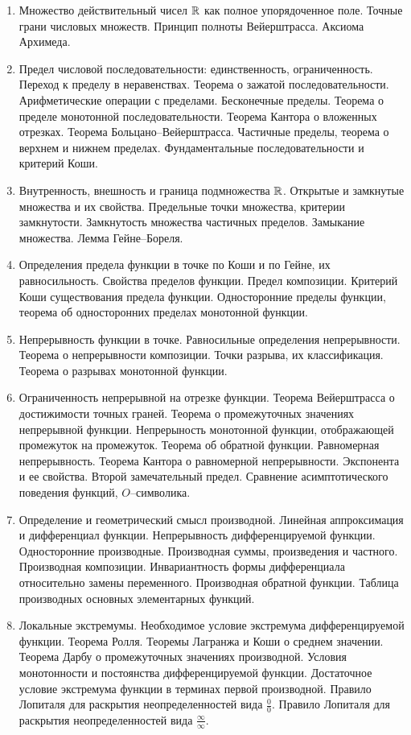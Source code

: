\begin{enumerate}
    \item Множество действительный чисел $\mathbb{R}$ как полное упорядоченное поле. Точные грани числовых множеств. Принцип полноты Вейерштрасса. Аксиома Архимеда.
    \item Предел числовой последовательности: единственность, ограниченность. Переход к пределу в неравенствах. Теорема о зажатой последовательности. Арифметические операции с пределами. Бесконечные пределы. Теорема о пределе монотонной последовательности. Теорема Кантора о вложенных отрезках. Теорема Больцано--Вейерштрасса. Частичные пределы, теорема о верхнем и нижнем пределах. Фундаментальные последовательности и критерий Коши.
    \item Внутренность, внешность и граница подмножества $\mathbb{R}$. Открытые и замкнутые множества и их свойства. Предельные точки множества, критерии замкнутости. Замкнутость множества частичных пределов. Замыкание множества. Лемма Гейне--Бореля.
    \item Определения предела функции в точке по Коши и по Гейне, их равносильность. Свойства пределов функции. Предел композиции. Критерий Коши существования предела функции. Односторонние пределы функции, теорема об односторонних пределах монотонной функции.
    \item Непрерывность функции в точке. Равносильные определения непрерывности. Теорема о непрерывности композиции. Точки разрыва, их классификация. Теорема о разрывах монотонной функции.
    \item Ограниченность непрерывной на отрезке функции. Теорема Вейерштрасса о достижимости точных граней. Теорема о промежуточных значениях непрерывной функции. Непрерыность монотонной функции, отображающей промежуток на промежуток. Теорема об обратной функции. Равномерная непрерывность. Теорема Кантора о равномерной непрерывности. Экспонента и ее свойства. Второй замечательный предел. Сравнение асимптотического поведения функций, $O$--символика.
    \item Определение и геометрический смысл производной. Линейная аппроксимация и дифференциал функции. Непрерывность дифференцируемой функции. Односторонние производные. Производная суммы, произведения и частного. Производная композиции. Инвариантность формы дифференциала относительно замены переменного. Производная обратной функции. Таблица производных основных элементарных функций.
    \item Локальные экстремумы. Необходимое условие экстремума дифференцируемой функции. Теорема Ролля. Теоремы Лагранжа и Коши о среднем значении. Теорема Дарбу о промежуточных значениях производной. Условия монотонности и постоянства дифференцируемой функции. Достаточное условие экстремума функции в терминах первой производной. Правило Лопиталя для раскрытия неопределенностей вида $\frac{0}{0}$. Правило Лопиталя для раскрытия неопределенностей вида $\frac{\infty}{\infty}$.

\end{enumerate}
